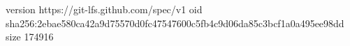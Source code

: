 version https://git-lfs.github.com/spec/v1
oid sha256:2ebae580ca42a9d75570d0fc47547600c5fb4c9d06da85c3bcf1a0a495ee98dd
size 174916
